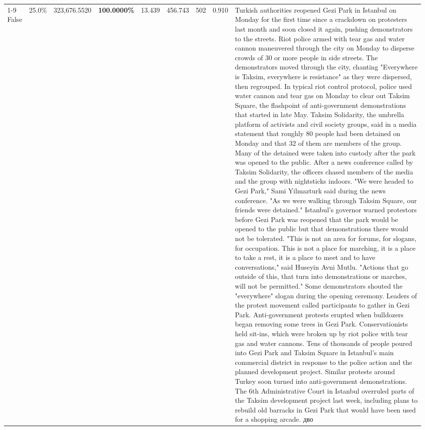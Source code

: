 \begin{table}[H]
\begin{tabular}{lllrlllll}
\cline{1-9}
False & 25.0\% & 323,676.5520 & \bfseries \color{red} 100.0000\% & 13.439 & 456.743 & 502 & 0.910 & Turkish authorities reopened Gezi Park in Istanbul on Monday for the first time since a crackdown on protesters last month and soon closed it again, pushing demonstrators to the streets. Riot police armed with tear gas and water cannon maneuvered through the city on Monday to disperse crowds of 30 or more people in side streets. The demonstrators moved through the city, chanting "Everywhere is Taksim, everywhere is resistance" as they were dispersed, then regrouped. In typical riot control protocol, police used water cannon and tear gas on Monday to clear out Taksim Square, the flashpoint of anti-government demonstrations that started in late May. Taksim Solidarity, the umbrella platform of activists and civil society groups, said in a media statement that roughly 80 people had been detained on Monday and that 32 of them are members of the group. Many of the detained were taken into custody after the park was opened to the public. After a news conference called by Taksim Solidarity, the officers chased members of the media and the group with nightsticks indoors. "We were headed to Gezi Park," Sami Yilmazturk said during the news conference. "As we were walking through Taksim Square, our friends were detained." Istanbul's governor warned protestors before Gezi Park was reopened that the park would be opened to the public but that demonstrations there would not be tolerated. "This is not an area for forums, for slogans, for occupation. This is not a place for marching, it is a place to take a rest, it is a place to meet and to have conversations," said Huseyin Avni Mutlu. "Actions that go outside of this, that turn into demonstrations or marches, will not be permitted." Some demonstrators shouted the "everywhere" slogan during the opening ceremony. Leaders of the protest movement called participants to gather in Gezi Park. Anti-government protests erupted when bulldozers began removing some trees in Gezi Park. Conservationists held sit-ins, which were broken up by riot police with tear gas and water cannons. Tens of thousands of people poured into Gezi Park and Taksim Square in Istanbul's main commercial district in response to the police action and the planned development project. Similar protests around Turkey soon turned into anti-government demonstrations. The 6th Administrative Court in Istanbul overruled parts of the Taksim development project last week, including plans to rebuild old barracks in Gezi Park that would have been used for a shopping arcade. дво \\

\end{tabular}
\end{table}
